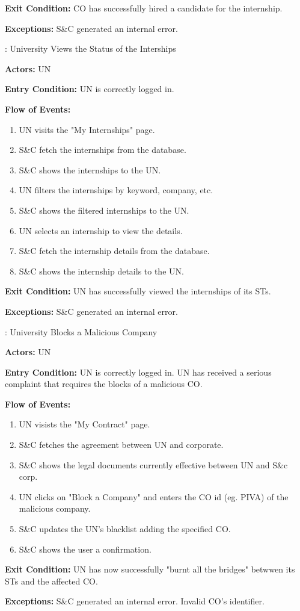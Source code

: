 \par \textbf{Exit Condition:} CO has successfully hired a candidate for the internship.

\par \textbf{Exceptions:}  S\&C generated an internal error.

\nextUseCaseID: University Views the Status of the Interships

\par \textbf{Actors:} UN

\par \textbf{Entry Condition:} UN is correctly logged in.

\par \textbf{Flow of Events:}

\begin{enumerate}
    \item UN visits the "My Internships" page.
    \item S\&C fetch the internships from the database.
    \item S\&C shows the internships to the UN.
    \item UN filters the internships by keyword, company, etc.
    \item S\&C shows the filtered internships to the UN.
    \item UN selects an internship to view the details.
    \item S\&C fetch the internship details from the database.
    \item S\&C shows the internship details to the UN.
\end{enumerate}

\par \textbf{Exit Condition:} UN has successfully viewed the internships of its STs.

\par \textbf{Exceptions:}  S\&C generated an internal error.

\nextUseCaseID: University Blocks a Malicious Company

\par \textbf{Actors:} UN

\par \textbf{Entry Condition:} UN is correctly logged in. UN has received a serious complaint that requires the blocks of a malicious CO.

\par \textbf{Flow of Events:}

\begin{enumerate}
    \item UN visists the "My Contract" page.
    \item S\&C fetches the agreement between UN and corporate.
    \item S\&C shows the legal documents currently effective between UN and S\&c corp.
    \item UN clicks on "Block a Company" and enters the CO id (eg. PIVA) of the malicious company.
    \item S\&C updates the UN's blacklist adding the specified CO.
    \item S\&C shows the user a confirmation.
\end{enumerate}

\par \textbf{Exit Condition:} UN has now successfully "burnt all the bridges" betwwen its STs and the affected CO.

\par \textbf{Exceptions:}  S\&C generated an internal error. Invalid CO's identifier.
